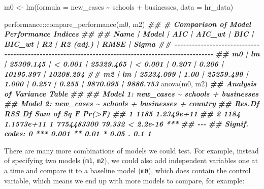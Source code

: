 \documentclass[
]{book}
\newenvironment{Shaded}{\begin{snugshade}}{\end{snugshade}}
\newcommand{\AttributeTok}[1]{\textcolor[rgb]{0.77,0.63,0.00}{#1}}
\newcommand{\DocumentationTok}[1]{\textcolor[rgb]{0.56,0.35,0.01}{\textbf{\textit{#1}}}}
\newcommand{\FunctionTok}[1]{\textcolor[rgb]{0.00,0.00,0.00}{#1}}
\newcommand{\NormalTok}[1]{#1}
\newcommand{\OtherTok}[1]{\textcolor[rgb]{0.56,0.35,0.01}{#1}}
\newcommand{\SpecialCharTok}[1]{\textcolor[rgb]{0.00,0.00,0.00}{#1}}
\begin{document}
\begin{Shaded}
\begin{Highlighting}[]
\NormalTok{m0 }\OtherTok{\textless{}{-}} \FunctionTok{lm}\NormalTok{(}\AttributeTok{formula =}\NormalTok{ new\_cases }\SpecialCharTok{\textasciitilde{}}
\NormalTok{           schools }\SpecialCharTok{+}
\NormalTok{           businesses,}
         \AttributeTok{data =}\NormalTok{ hr\_data)}

\NormalTok{performance}\SpecialCharTok{::}\FunctionTok{compare\_performance}\NormalTok{(m0, m2)}
\DocumentationTok{\#\# \# Comparison of Model Performance Indices}
\DocumentationTok{\#\# }
\DocumentationTok{\#\# Name | Model |       AIC |  AIC\_wt |       BIC |  BIC\_wt |    R2 | R2 (adj.) |      RMSE |     Sigma}
\DocumentationTok{\#\# {-}{-}{-}{-}{-}{-}{-}{-}{-}{-}{-}{-}{-}{-}{-}{-}{-}{-}{-}{-}{-}{-}{-}{-}{-}{-}{-}{-}{-}{-}{-}{-}{-}{-}{-}{-}{-}{-}{-}{-}{-}{-}{-}{-}{-}{-}{-}{-}{-}{-}{-}{-}{-}{-}{-}{-}{-}{-}{-}{-}{-}{-}{-}{-}{-}{-}{-}{-}{-}{-}{-}{-}{-}{-}{-}{-}{-}{-}{-}{-}{-}{-}{-}{-}{-}{-}{-}{-}{-}{-}{-}{-}{-}{-}{-}{-}{-}{-}{-}{-}}
\DocumentationTok{\#\# m0   |    lm | 25309.145 | \textless{} 0.001 | 25329.465 | \textless{} 0.001 | 0.207 |     0.206 | 10195.397 | 10208.294}
\DocumentationTok{\#\# m2   |    lm | 25234.099 |    1.00 | 25259.499 |   1.000 | 0.257 |     0.255 |  9870.095 |  9886.753}
\FunctionTok{anova}\NormalTok{(m0, m2)}
\DocumentationTok{\#\# Analysis of Variance Table}
\DocumentationTok{\#\# }
\DocumentationTok{\#\# Model 1: new\_cases \textasciitilde{} schools + businesses}
\DocumentationTok{\#\# Model 2: new\_cases \textasciitilde{} schools + businesses + country}
\DocumentationTok{\#\#   Res.Df        RSS Df  Sum of Sq      F    Pr(\textgreater{}F)    }
\DocumentationTok{\#\# 1   1185 1.2349e+11                                   }
\DocumentationTok{\#\# 2   1184 1.1573e+11  1 7754483300 79.332 \textless{} 2.2e{-}16 ***}
\DocumentationTok{\#\# {-}{-}{-}}
\DocumentationTok{\#\# Signif. codes:  0 \textquotesingle{}***\textquotesingle{} 0.001 \textquotesingle{}**\textquotesingle{} 0.01 \textquotesingle{}*\textquotesingle{} 0.05 \textquotesingle{}.\textquotesingle{} 0.1 \textquotesingle{} \textquotesingle{} 1}
\end{Highlighting}
\end{Shaded}

There are many more combinations of models we could test. For example, instead of specifying two models (\texttt{m1}, \texttt{m2}), we could also add independent variables one at a time and compare it to a baseline model (\texttt{m0}), which does contain the control variable, which means we end up with more models to compare, for example:
\end{document}
